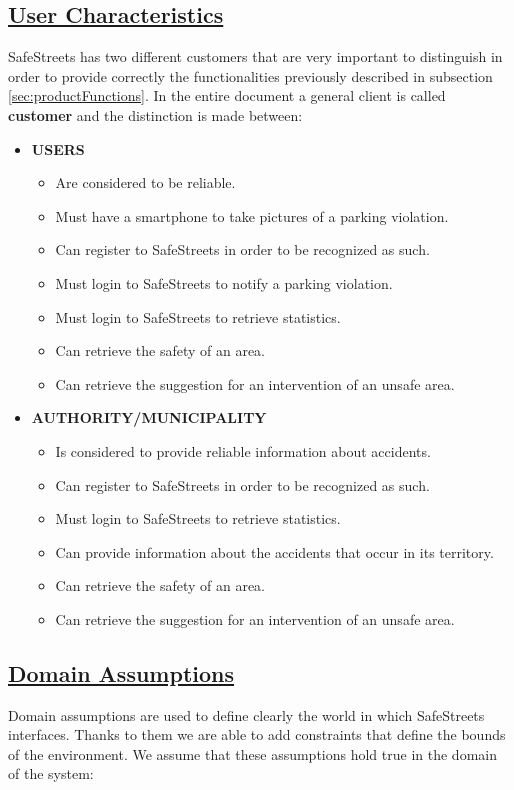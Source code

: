 \subsection[User Characteristics]{\hyperlink{toc}{User Characteristics}}
	SafeStreets has two different customers that are very important to distinguish in order to provide correctly the functionalities previously described in subsection \ref{sec:productFunctions}. In the entire document a general client is called \textbf{customer} and the distinction is made between:
	
	\begin{itemize}
		\item \textbf{USERS}
			\begin{itemize}
				\item Are considered to be reliable.
				\item Must have a smartphone to take pictures of a parking violation.
				\item Can register to SafeStreets in order to be recognized as such.
				\item Must login to SafeStreets to notify a parking violation.
				\item Must login to SafeStreets to retrieve statistics.
				\item Can retrieve the safety of an area.
				\item Can retrieve the suggestion for an intervention of an unsafe area.
			\end{itemize}
		\item \textbf{AUTHORITY/MUNICIPALITY}
			\begin{itemize}
				\item Is considered to provide reliable information about accidents.
				\item Can register to SafeStreets in order to be recognized as such.
				\item Must login to SafeStreets to retrieve statistics.
				\item Can provide information about the accidents that occur in its territory.
				\item Can retrieve the safety of an area.
				\item Can retrieve the suggestion for an intervention of an unsafe area.
			\end{itemize}
	\end{itemize}
	
\subsection[Domain Assumptions]{\hyperlink{toc}{Domain Assumptions}}
	\label{sec:domainAssumptions}
	Domain assumptions are used to define clearly the world in which SafeStreets interfaces. Thanks to them we are able to add constraints that define the bounds of the environment. We assume that these assumptions hold true in the domain of the system:
		
